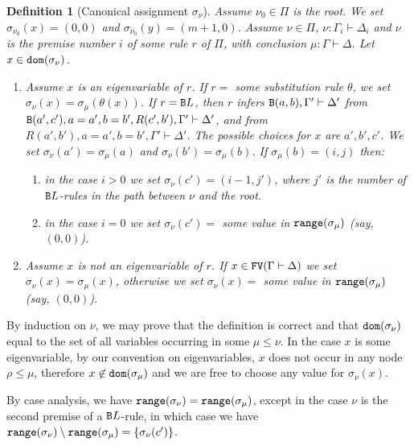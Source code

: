 \documentclass[a4paper,12pt]{article}
\newtheorem{definition}[theorem]{Definition}
\newcommand{\Backward}         { {\tt B} }
\newcommand{\FV}              { {\tt FV} }
\newcommand{\dom}             { {\tt dom} }
\newcommand{\range}           { {\tt range} }
\begin{document}
\begin{definition}[Canonical assignment $\sigma_\nu$]
Assume $\nu _0 \in \Pi$ is the root. We set $\sigma_{\nu_0}(x) = (0,0)$ and $\sigma_{\nu_0}(y) = (m+1,0)$. Assume $\nu \in \Pi$, $\nu:\Gamma_i \vdash \Delta_i$ and $\nu$ is the premise number $i$ of some rule $r$ of $\Pi$, with conclusion $\mu : \Gamma \vdash \Delta$. Let $x \in \dom(\sigma_\nu)$.
\begin{enumerate}
\item
Assume $x$ is an eigenvariable of $r$. If $r=$ some substitution rule $\theta$, we set $\sigma_\nu(x) = \sigma_\mu(\theta(x))$. If $r = \Backward L$, then  $r$ infers $\Backward(a,b),\Gamma' \vdash \Delta'$ from $\Backward(a',c'),a=a',b=b',R(c',b'),\Gamma' \vdash \Delta'$, and from $R(a',b'),a=a',b=b',\Gamma' \vdash \Delta'$. The possible choices for $x$ are $a',b',c'$. We set $\sigma_\nu(a') = \sigma_\mu(a)$ and $\sigma_\nu(b') = \sigma_\mu(b)$. If $\sigma_\mu(b) = (i,j)$ then: 
\begin{enumerate} 
\item 
in the case $i>0$ we set $\sigma_\nu(c') = (i-1,j')$, where $j'$ is the number of $\Backward L$-rules in the path between $\nu$ and the root.
\item
in the case $i=0$ we set $\sigma_\nu(c') =$ some value in $\range(\sigma_\mu)$ (say, $(0,0)$). 
\end{enumerate}
\item
Assume $x$ is not an eigenvariable of $r$. If $x\in\FV(\Gamma \vdash \Delta)$ we set $\sigma_\nu(x) = \sigma_\mu(x)$, otherwise we set $\sigma_\nu(x) =$ some value in $\range(\sigma_\mu)$ (say, $(0,0)$).
\end{enumerate}
\end{definition}

By induction on $\nu$, we may prove that the definition is correct and that $\dom(\sigma_\nu)$ equal to the set of all variables occurring in some $\mu \le \nu$. In the case $x$ is some  eigenvariable, by our convention on eigenvariables, $x$ does not occur in any node $\rho \le \mu$, therefore $x \not \in \dom(\sigma_\mu)$ and we are free to choose any value for $\sigma_\nu(x)$.

By case analysis, we have $\range(\sigma_\nu) = \range(\sigma_\mu)$, except in the case $\nu$ is the second premise of a $\Backward L$-rule, in which case we have $\range(\sigma_\nu) \setminus \range(\sigma_\mu) = \{\sigma_\nu(c')\}$. 
\end{document}
